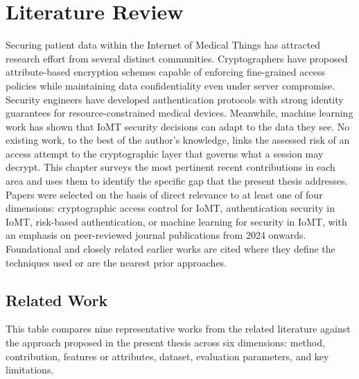 \chapter{Literature Review} %
\label{cha:_literature_review}

Securing patient data within the Internet of Medical Things has attracted research effort from several distinct communities. Cryptographers have proposed attribute-based encryption schemes capable of enforcing fine-grained access policies while maintaining data confidentiality even under server compromise. Security engineers have developed authentication protocols with strong identity guarantees for resource-constrained medical devices. Meanwhile, machine learning work has shown that IoMT security decisions can adapt to the data they see. No existing work, to the best of the author's knowledge, links the assessed risk of an access attempt to the cryptographic layer that governs what a session may decrypt. This chapter surveys the most pertinent recent contributions in each area and uses them to identify the specific gap that the present thesis addresses. Papers were selected on the basis of direct relevance to at least one of four dimensions: cryptographic access control for IoMT, authentication security in IoMT, risk-based authentication, or machine learning for security in IoMT, with an emphasis on peer-reviewed journal publications from 2024 onwards. Foundational and closely related earlier works are cited where they define the techniques used or are the nearest prior approaches.

\section{Related Work} %
\label{sec:section_21}

This table compares nine representative works from the related literature against the approach proposed in the present thesis across six dimensions: method, contribution, features or attributes, dataset, evaluation parameters, and key limitations.

